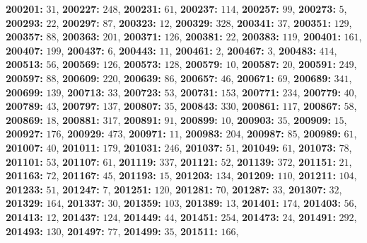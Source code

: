 \textsf{\bfseries 200201:} $31$, \textsf{\bfseries 200227:} $248$, \textsf{\bfseries 200231:} $61$, \textsf{\bfseries 200237:} $114$, \textsf{\bfseries 200257:} $99$, \textsf{\bfseries 200273:} $5$, \textsf{\bfseries 200293:} $22$, \textsf{\bfseries 200297:} $87$, \textsf{\bfseries 200323:} $12$, \textsf{\bfseries 200329:} $328$, \textsf{\bfseries 200341:} $37$, \textsf{\bfseries 200351:} $129$, \textsf{\bfseries 200357:} $88$, \textsf{\bfseries 200363:} $201$, \textsf{\bfseries 200371:} $126$, \textsf{\bfseries 200381:} $22$, \textsf{\bfseries 200383:} $119$, \textsf{\bfseries 200401:} $161$, \textsf{\bfseries 200407:} $199$, \textsf{\bfseries 200437:} $6$, \textsf{\bfseries 200443:} $11$, \textsf{\bfseries 200461:} $2$, \textsf{\bfseries 200467:} $3$, \textsf{\bfseries 200483:} $414$, \textsf{\bfseries 200513:} $56$, \textsf{\bfseries 200569:} $126$, \textsf{\bfseries 200573:} $128$, \textsf{\bfseries 200579:} $10$, \textsf{\bfseries 200587:} $20$, \textsf{\bfseries 200591:} $249$, \textsf{\bfseries 200597:} $88$, \textsf{\bfseries 200609:} $220$, \textsf{\bfseries 200639:} $86$, \textsf{\bfseries 200657:} $46$, \textsf{\bfseries 200671:} $69$, \textsf{\bfseries 200689:} $341$, \textsf{\bfseries 200699:} $139$, \textsf{\bfseries 200713:} $33$, \textsf{\bfseries 200723:} $53$, \textsf{\bfseries 200731:} $153$, \textsf{\bfseries 200771:} $234$, \textsf{\bfseries 200779:} $40$, \textsf{\bfseries 200789:} $43$, \textsf{\bfseries 200797:} $137$, \textsf{\bfseries 200807:} $35$, \textsf{\bfseries 200843:} $330$, \textsf{\bfseries 200861:} $117$, \textsf{\bfseries 200867:} $58$, \textsf{\bfseries 200869:} $18$, \textsf{\bfseries 200881:} $317$, \textsf{\bfseries 200891:} $91$, \textsf{\bfseries 200899:} $10$, \textsf{\bfseries 200903:} $35$, \textsf{\bfseries 200909:} $15$, \textsf{\bfseries 200927:} $176$, \textsf{\bfseries 200929:} $473$, \textsf{\bfseries 200971:} $11$, \textsf{\bfseries 200983:} $204$, \textsf{\bfseries 200987:} $85$, \textsf{\bfseries 200989:} $61$, \textsf{\bfseries 201007:} $40$, \textsf{\bfseries 201011:} $179$, \textsf{\bfseries 201031:} $246$, \textsf{\bfseries 201037:} $51$, \textsf{\bfseries 201049:} $61$, \textsf{\bfseries 201073:} $78$, \textsf{\bfseries 201101:} $53$, \textsf{\bfseries 201107:} $61$, \textsf{\bfseries 201119:} $337$, \textsf{\bfseries 201121:} $52$, \textsf{\bfseries 201139:} $372$, \textsf{\bfseries 201151:} $21$, \textsf{\bfseries 201163:} $72$, \textsf{\bfseries 201167:} $45$, \textsf{\bfseries 201193:} $15$, \textsf{\bfseries 201203:} $134$, \textsf{\bfseries 201209:} $110$, \textsf{\bfseries 201211:} $104$, \textsf{\bfseries 201233:} $51$, \textsf{\bfseries 201247:} $7$, \textsf{\bfseries 201251:} $120$, \textsf{\bfseries 201281:} $70$, \textsf{\bfseries 201287:} $33$, \textsf{\bfseries 201307:} $32$, \textsf{\bfseries 201329:} $164$, \textsf{\bfseries 201337:} $30$, \textsf{\bfseries 201359:} $103$, \textsf{\bfseries 201389:} $13$, \textsf{\bfseries 201401:} $174$, \textsf{\bfseries 201403:} $56$, \textsf{\bfseries 201413:} $12$, \textsf{\bfseries 201437:} $124$, \textsf{\bfseries 201449:} $44$, \textsf{\bfseries 201451:} $254$, \textsf{\bfseries 201473:} $24$, \textsf{\bfseries 201491:} $292$, \textsf{\bfseries 201493:} $130$, \textsf{\bfseries 201497:} $77$, \textsf{\bfseries 201499:} $35$, \textsf{\bfseries 201511:} $166$, 
